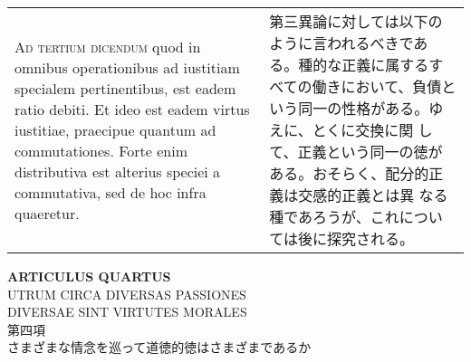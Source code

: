 \documentclass[10pt]{jsarticle}
\begin{document}
\begin{longtable}{p{21em}p{21em}}
\\



{\scshape Ad tertium dicendum} quod in omnibus operationibus ad
iustitiam specialem pertinentibus, est eadem ratio debiti. Et ideo est
eadem virtus iustitiae, praecipue quantum ad commutationes. Forte enim
distributiva est alterius speciei a commutativa, sed de hoc infra
quaeretur.


&

第三異論に対しては以下のように言われるべきである。種的な正義に属するす
べての働きにおいて、負債という同一の性格がある。ゆえに、とくに交換に関
して、正義という同一の徳がある。おそらく、配分的正義は交感的正義とは異
なる種であろうが、これについては後に探究される。
 


\end{longtable}
\newpage


\begin{center}
{\Large {\bf ARTICULUS QUARTUS}}\\
{\large UTRUM CIRCA DIVERSAS PASSIONES\\DIVERSAE SINT VIRTUTES MORALES}\\
 {\Large 第四項\\さまざまな情念を巡って道徳的徳はさまざまであるか}
\end{center}
\end{document}
